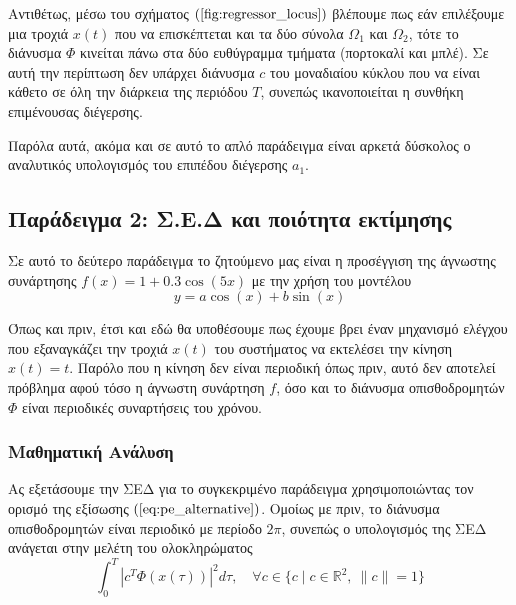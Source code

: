 Αντιθέτως, μέσω του σχήματος $(\ref{fig:regressor_locus})$ βλέπουμε πως εάν επιλέξουμε μια τροχιά $x(t)$ που να επισκέπτεται και τα δύο σύνολα $\Omega_1$ και $\Omega_2$, τότε το διάνυσμα $\varPhi$ κινείται πάνω στα δύο ευθύγραμμα τμήματα (πορτοκαλί και μπλέ). Σε αυτή την περίπτωση δεν υπάρχει διάνυσμα $c$ του μοναδιαίου κύκλου που να είναι κάθετο σε όλη την διάρκεια της περιόδου $T$, συνεπώς ικανοποιείται η συνθήκη επιμένουσας διέγερσης.

Παρόλα αυτά, ακόμα και σε αυτό το απλό παράδειγμα είναι αρκετά δύσκολος ο αναλυτικός υπολογισμός του επιπέδου διέγερσης $a_1$.

\subsection{Παράδειγμα 2: Σ.Ε.Δ και ποιότητα εκτίμησης}
Σε αυτό το δεύτερο παράδειγμα το ζητούμενο μας είναι η προσέγγιση της άγνωστης συνάρτησης $f(x) = 1 + 0.3\cos(5x)$ με την χρήση του μοντέλου
\begin{equation*}
	y = a \cos(x) + b \sin(x)
\end{equation*}

Όπως και πριν, έτσι και εδώ θα υποθέσουμε πως έχουμε βρει έναν μηχανισμό ελέγχου που εξαναγκάζει την τροχιά $x(t)$ του συστήματος να εκτελέσει την κίνηση $x(t) = t$. Παρόλο που η κίνηση δεν είναι περιοδική όπως πριν, αυτό δεν αποτελεί πρόβλημα αφού τόσο η άγνωστη συνάρτηση $f$, όσο και το διάνυσμα οπισθοδρομητών $\varPhi$ είναι περιοδικές συναρτήσεις του χρόνου.

\subsubsection{Μαθηματική Ανάλυση}
Ας εξετάσουμε την ΣΕΔ για το συγκεκριμένο παράδειγμα χρησιμοποιώντας τον ορισμό της εξίσωσης $(\ref{eq:pe_alternative})$. Ομοίως με πριν, το διάνυσμα οπισθοδρομητών είναι περιοδικό με περίοδο $2\pi$, συνεπώς ο υπολογισμός της ΣΕΔ ανάγεται στην μελέτη του ολοκληρώματος
\begin{equation*}
	\int_{0}^{T} \left| c^T \varPhi(x(\tau)) \right|^2 d\tau, \quad
	\forall c \in
	\{c \mid c \in \mathbb{R}^2, \: \|c\| =1 \}
\end{equation*}

